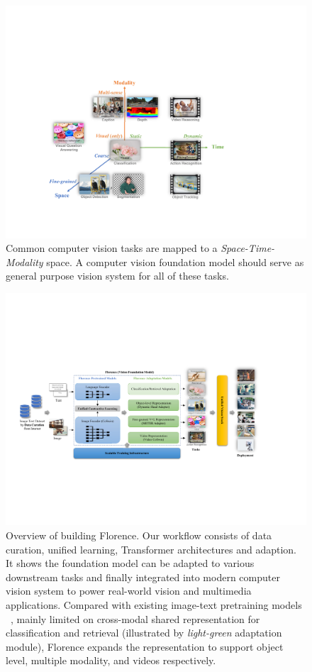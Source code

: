 \documentclass{article}
\begin{document}
\begin{figure}[t]
  \centering
   \includegraphics[width=1.0\linewidth]{figure/ProblemSpace1.pdf}
  \caption{Common computer vision tasks are mapped to a \emph{Space-Time-Modality} space. A computer vision foundation model should serve as general purpose vision system for all of these tasks.}
  \label{fig:problem}
\end{figure}

\begin{figure}[t]
  \centering
   \includegraphics[width=1.0\linewidth]{figure/overview1.pdf}
  \caption{Overview of building Florence. Our workflow consists of data curation, unified learning,
  Transformer architectures and adaption. It shows the foundation model can be adapted to various
  downstream tasks and finally integrated into modern computer vision system to power real-world
  vision and multimedia applications. Compared with existing image-text pretraining models ~\cite{radford2021learning,jia2021scaling,Wudao2}, mainly limited on cross-modal shared representation for classification and retrieval (illustrated by \emph{light-green} adaptation module), Florence expands the representation to support object level, multiple modality, and videos respectively.}
  \label{fig:overview}
\end{figure}
\end{document}
